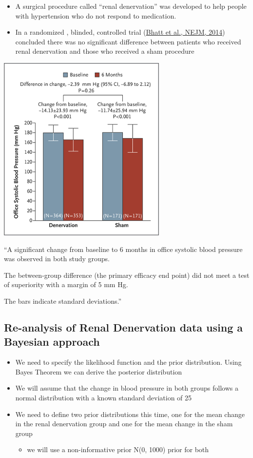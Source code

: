 \documentclass[
]{book}
\providecommand{\tightlist}{%
  \setlength{\itemsep}{0pt}\setlength{\parskip}{0pt}}
\begin{document}
\begin{itemize}
\tightlist
\item
  A surgical procedure called ``renal denervation'' was developed to help people with hypertension who do not respond to medication.
\item
  In a randomized , blinded, controlled trial (\href{https://www.nejm.org/doi/full/10.1056/NEJMoa1402670}{Bhatt et al., NEJM, 2014}) concluded there was no significant difference between patients who received renal denervation and those who received a sham procedure
\end{itemize}

\includegraphics[width=0.5\linewidth]{./6_38}

``A significant change from baseline to 6 months in office systolic blood pressure was observed in both study groups.

The between-group difference (the primary efficacy end point) did not meet a test of superiority with a margin of 5 mm Hg.

The bars indicate standard deviations.''

\hypertarget{re-analysis-of-renal-denervation-data-using-a-bayesian-approach}{%
\subsection{Re-analysis of Renal Denervation data using a Bayesian approach}\label{re-analysis-of-renal-denervation-data-using-a-bayesian-approach}}

\begin{itemize}
\tightlist
\item
  We need to specify the likelihood function and the prior distribution. Using Bayes Theorem we can derive the posterior distribution
\item
  We will assume that the change in blood pressure in both groups follows a normal distribution with a known standard deviation of 25
\item
  We need to define two prior distributions this time, one for the mean change in the renal denervation group and one for the mean change in the sham group

  \begin{itemize}
  \tightlist
  \item
    we will use a non-informative prior N(0, 1000) prior for both
  \end{itemize}
\end{itemize}
\end{document}
